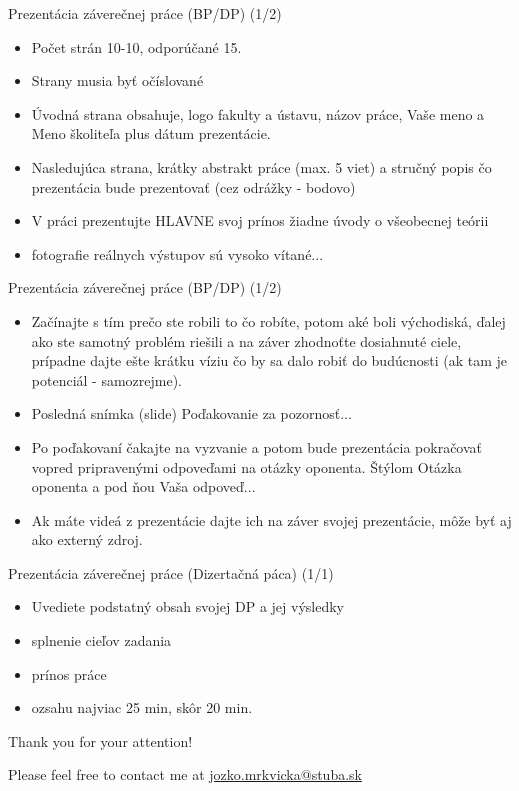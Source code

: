 \documentclass{beamer}
\begin{document}
\begin{frame}{Prezentácia záverečnej práce (BP/DP) (1/2)}
\begin{itemize}
  \item Počet strán 10-10, odporúčané 15.
  \item Strany musia byť očíslované
 \item Úvodná strana obsahuje, logo fakulty a ústavu, názov práce, Vaše meno a Meno školiteľa plus dátum prezentácie.
 \item Nasledujúca strana, krátky abstrakt práce (max. 5 viet) a stručný popis čo prezentácia bude prezentovať (cez odrážky - bodovo)
 \item V práci prezentujte HLAVNE svoj prínos žiadne úvody o všeobecnej teórii
  \item fotografie reálnych výstupov sú vysoko vítané...

\end{itemize}

\end{frame}


\begin{frame}{Prezentácia záverečnej práce (BP/DP) (1/2)}
\begin{itemize}
 \item Začínajte s tím prečo ste robili to čo robíte, potom aké boli východiská, ďalej ako ste samotný problém riešili a na záver zhodnoťte dosiahnuté ciele, prípadne dajte ešte krátku víziu čo by sa dalo robiť do budúcnosti (ak tam je potenciál - samozrejme).
 \item Posledná snímka (slide) Poďakovanie za pozornosť...
 \item Po poďakovaní čakajte na vyzvanie a potom bude prezentácia pokračovať vopred pripravenými odpoveďami na otázky oponenta. Štýlom Otázka oponenta a pod ňou Vaša odpoveď...
 \item Ak máte videá z prezentácie dajte ich na záver svojej prezentácie, môže byť aj ako externý zdroj.
\end{itemize}

\end{frame}


\begin{frame}{Prezentácia záverečnej práce (Dizertačná páca) (1/1)}
\begin{itemize}
 \item Uvediete podstatný obsah svojej DP a jej výsledky
 \item splnenie cieľov zadania
 \item prínos práce
 \item ozsahu najviac 25 min, skôr 20 min.
\end{itemize}
\end{frame}






\begin{frame}
\vspace{8em}
{\Huge Thank you for your attention!}

\vspace{8em}
Please feel free to contact me at
\url{jozko.mrkvicka@stuba.sk}
\end{frame}
\end{document}
